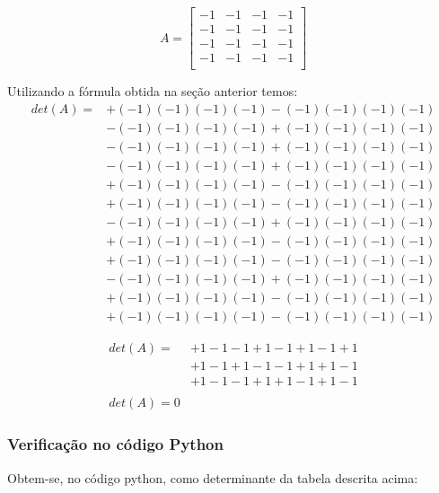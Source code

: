 \documentclass[12pt, a4paper]{article}
\begin{document}
\begin{equation*}
A = 
\begin{bmatrix}
-1 & -1 & -1 & -1\\
-1 & -1 & -1 & -1\\
-1 & -1 & -1 & -1\\
-1 & -1 & -1 & -1\\
\end{bmatrix}
\end{equation*}

Utilizando a fórmula obtida na seção anterior temos:
\newline
\begin{equation*}
\begin{aligned}
det(A) = & + (-1)(-1)(-1)(-1) 
- (-1)(-1)(-1)(-1) \\
& - (-1)(-1)(-1)(-1) 
+ (-1)(-1)(-1)(-1) \\
& - (-1)(-1)(-1)(-1) 
+ (-1)(-1)(-1)(-1) \\
& - (-1)(-1)(-1)(-1)
+ (-1)(-1)(-1)(-1) \\
& + (-1)(-1)(-1)(-1) 
- (-1)(-1)(-1)(-1) \\
& + (-1)(-1)(-1)(-1)
- (-1)(-1)(-1)(-1) \\
& - (-1)(-1)(-1)(-1) 
+ (-1)(-1)(-1)(-1) \\
& + (-1)(-1)(-1)(-1) 
- (-1)(-1)(-1)(-1) \\
& + (-1)(-1)(-1)(-1) 
- (-1)(-1)(-1)(-1) \\
& - (-1)(-1)(-1)(-1) 
+ (-1)(-1)(-1)(-1) \\
& + (-1)(-1)(-1)(-1) 
- (-1)(-1)(-1)(-1) \\
& + (-1)(-1)(-1)(-1)
- (-1)(-1)(-1)(-1)
\end{aligned}
\end{equation*}

\begin{equation*}
\begin{aligned}
det(A) = & + 1 - 1 - 1 + 1 - 1 + 1 - 1 + 1 \\
& + 1 - 1  + 1 - 1 - 1 + 1 + 1 - 1 \\ 
& + 1 - 1 - 1 + 1 + 1 - 1 + 1 - 1
\\\\
det(A) = 0
\end{aligned}
\end{equation*}
\subsubsection{Verificação no código Python}
Obtem-se, no código python, como determinante da tabela descrita acima:
\end{document}
